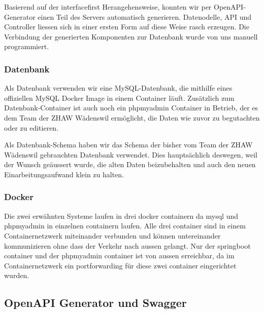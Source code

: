 \documentclass[../main.tex]{subfiles}
\begin{document}
	Basierend auf der \gls{interfacefirst} Herangehensweise, konnten wir per OpenAPI-Generator einen Teil des Servers automatisch generieren. Datenodelle, API und Controller liessen sich in einer ersten Form auf diese Weise rasch erzeugen. Die Verbindung der generierten Komponenten zur Datenbank wurde von uns manuell programmiert.
	
	\subsubsection{Datenbank}
	Als Datenbank verwenden wir eine MySQL-Datenbank, die mithilfe eines offiziellen MySQL Docker Image in einem Container läuft. Zusätzlich zum Datenbank-Container ist auch noch ein \gls{phpmyadmin} Container in Betrieb, der es dem Team der ZHAW Wädenswil ermöglicht, die Daten wie zuvor zu begutachten oder zu editieren.
	
	Als Datenbank-Schema haben wir das Schema der bisher vom Team der ZHAW Wädenswil gebrauchten Datenbank verwendet. Dies hauptsächlich deswegen, weil der Wunsch geäussert wurde, die alten Daten beizubehalten und auch den neuen Einarbeitungsaufwand klein zu halten.
	
	\subsubsection{Docker}
	Die zwei erwähnten Systeme laufen in drei \gls{docker} \gls{container}n da \gls{mysql} und \gls{phpmyadmin} in einzelnen \gls{container}n laufen. Alle drei \gls{container} sind in einem Containernetzwerk miteinander verbunden und können untereinander kommunizieren ohne dass der Verkehr nach aussen gelangt. Nur der \gls{springboot} \gls{container} und der \gls{phpmyadmin} \gls{container} ist von aussen erreichbar, da im Containernetzwerk ein \gls{portforwarding} für diese zwei \gls{container} eingerichtet wurden.
	
	\subsection{OpenAPI Generator und Swagger}
	
\end{document}
